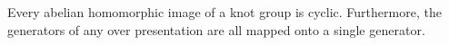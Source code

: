 Every abelian homomorphic image of a knot group is cyclic. Furthermore, the generators of any over presentation are all mapped onto a single generator.
